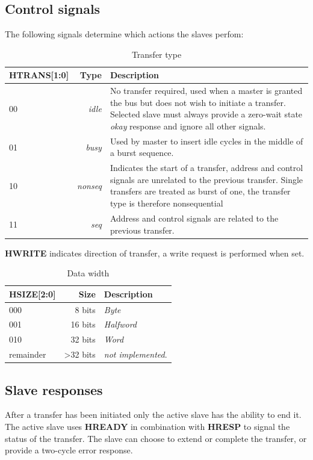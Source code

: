 \newpage
\subsection{Control signals}
The following signals determine which actions the slaves perfom:
\begin{table}[hbt]
  \label{tab:htrans}
  \begin{tabular}{|p{28mm}|r|p{10cm}|} 
  \hline
  \textbf{HTRANS[1:0]} & \textbf{Type} & \textbf{Description} \\
    \hline
  00 & \textit{idle} & No transfer required, used when a master is granted the bus but does not wish to initiate a transfer. Selected slave must always provide a zero-wait state \textit{okay} response and ignore all other signals.\\
    \hline
  01 & \textit{busy} & Used by master to insert idle cycles in the middle of a burst sequence. \\
    \hline
  10 & \textit{nonseq} & Indicates the start of a transfer, address and control signals are unrelated to the previous transfer. Single transfers are treated as burst of one, the transfer type is therefore nonsequential\\
    \hline
  11 & \textit{seq} & Address and control signals are related to the previous transfer.\\
\hline
  \end{tabular}
\caption{Transfer type}
\end{table}

\textbf{HWRITE} indicates direction of transfer, a write request is performed when set.

\begin{table}[hbt]
  \label{tab:hsize}
  \begin{tabular}{|p{25mm}|r|p{10cm}|} 
  \hline
  \textbf{HSIZE[2:0]} & \textbf{Size} & \textbf{Description} \\
    \hline
  000 & 8 bits & \textit{Byte}\\
    \hline
  001 & 16 bits & \textit{Halfword} \\
    \hline
  010 & 32 bits & \textit{Word}\\
    \hline
  remainder & >32 bits & \textit{not implemented}.\\
\hline
  \end{tabular}
\caption{Data width}
\end{table}

\newpage

\subsection{Slave responses}
\label{subsec:slvresp}
After a transfer has been initiated only the active slave has the ability to end it. The active slave uses \textbf{HREADY} in combination with \textbf{HRESP} to signal the status of the transfer. The slave can choose to extend or complete the transfer, or provide a two-cycle error response. 

